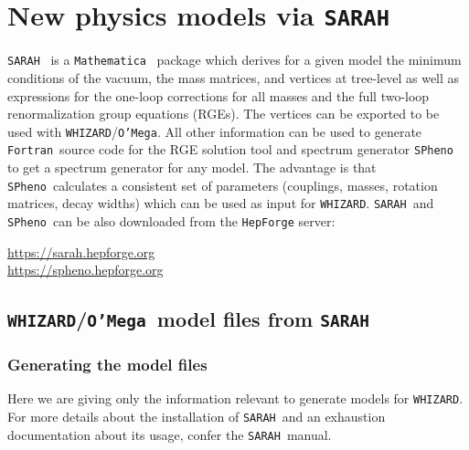 \documentclass[12pt]{book}
\newcommand{\ttt}[1]{\texttt{#1}}
\newcommand{\whizard}{\ttt{WHIZARD}}
\newcommand{\oMega}{\ttt{O'Mega}}
\newcommand{\sarah}{\ttt{SARAH}}
\newcommand{\spheno}{\ttt{SPheno}}
\newcommand{\Mathematica}{\ttt{Mathematica}}
\newcommand{\fortran}{\ttt{Fortran}}
\begin{document}
\section{New physics models via \sarah}
\sarah~\cite{Staub:2008uz,Staub:2009bi,Staub:2010jh,Staub:2012pb,Staub:2013tta}
is a \Mathematica~\cite{mathematica} package which
derives for a given model the
minimum conditions of the vacuum, the mass matrices, and vertices at tree-level
as well as expressions for the one-loop corrections for all masses and the
full two-loop renormalization group equations (RGEs). The vertices can be exported
to be used with \whizard/\oMega. All other information can be used to generate
\fortran\ source code for the RGE solution tool and spectrum generator
\spheno~\cite{Porod:2003um,Porod:2011nf}  to get a spectrum generator
for any model. The
advantage is that \spheno\ calculates a consistent set of parameters (couplings,
masses, rotation matrices, decay widths) which can be used as input for \whizard.
\sarah\ and \spheno\ can be also downloaded from the \ttt{HepForge} server:
\begin{center}
\url{https://sarah.hepforge.org} \\
\url{https://spheno.hepforge.org}
\end{center}


\subsection{\whizard/\oMega\ model files from \sarah}

\subsubsection{Generating the model files}

Here we are giving only the information relevant to generate models
for \whizard. For more details about the installation of \sarah\ and
an exhaustion documentation about its usage, confer the \sarah\
manual.
\end{document}
